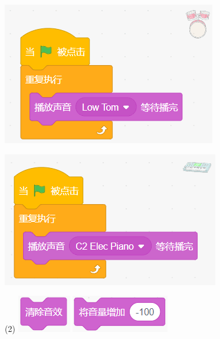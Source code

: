 \documentclass[10pt, a4paper]{article}
\begin{document}
\begin{enumerate}
        \begin{minipage}{.2\textwidth}
            \centering
            \includegraphics[width=\textwidth]{figure/20-1.png}
        \end{minipage}
        \begin{minipage}{.2\textwidth}
            \centering
            \includegraphics[width=\textwidth]{figure/20-2.png}
        \end{minipage}
        \begin{minipage}{.48\textwidth}
            \begin{tasks}(2)
                \task \includegraphics[width=.15\textwidth]{figure/20a.png}
                \task \includegraphics[width=.25\textwidth]{figure/20b.png}

\end{tasks}
\end{minipage}
\end{enumerate}
\end{document}
